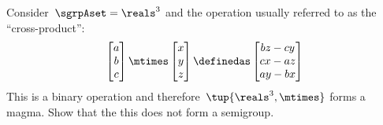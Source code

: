 \begin{exercise}
  \label{ex:cross_prod}
  Consider~$\sgrpAset=\reals^3$ and the operation usually referred to as the ``cross-product'':
  \begin{equation*}
    \begin{bmatrix}
      a\\ b\\ c
    \end{bmatrix}\mtimes \begin{bmatrix}
                           x\\ y \\ z
    \end{bmatrix}\definedas
    \begin{bmatrix}
      bz-cy\\
      cx-az\\
      ay-bx
    \end{bmatrix}
  \end{equation*}
  This is a binary operation and therefore~$\tup{\reals^3,\mtimes}$ forms a magma. Show that the this does not form a semigroup.
\end{exercise}
\begin{solution}
\end{solution}


